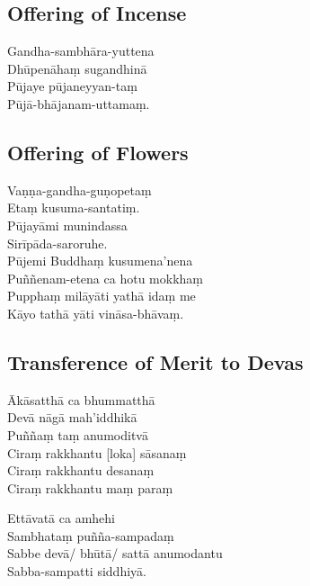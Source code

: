 \subsection{Offering of Incense}


\begin{paritta}
Gandha-sambhāra-yuttena\\
Dhūpenāhaṃ sugandhinā\\
Pūjaye pūjaneyyan-taṃ\\
Pūjā-bhājanam-uttamaṃ.
\end{paritta}

\subsection{Offering of Flowers}


\begin{paritta}
Vaṇṇa-gandha-guṇopetaṃ\\
Etaṃ kusuma-santatiṃ.\\
Pūjayāmi munindassa\\
Sirīpāda-saroruhe.\\
Pūjemi Buddhaṃ kusumena'nena\\
Puññenam-etena ca hotu mokkhaṃ\\
Pupphaṃ milāyāti yathā idaṃ me\\
Kāyo tathā yāti vināsa-bhāvaṃ.
\end{paritta}

\subsection{Transference of Merit to Devas}


\begin{paritta}
Ākāsatthā ca bhummatthā\\
Devā nāgā mah'iddhikā\\
Puññaṃ taṃ anumoditvā\\
Ciraṃ rakkhantu [loka] sāsanaṃ\\
Ciraṃ rakkhantu desanaṃ\\
Ciraṃ rakkhantu maṃ paraṃ
\end{paritta}

\begin{paritta}
Ettāvatā ca amhehi\\
Sambhataṃ puñña-sampadaṃ\\
Sabbe devā/ bhūtā/ sattā anumodantu\\
Sabba-sampatti siddhiyā.
\end{paritta}

